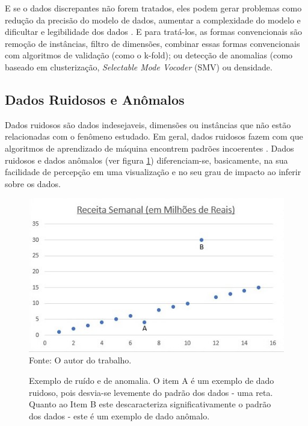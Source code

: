 \documentclass[
	12pt,				%
	openright,			%
	oneside,			%
	a4paper,			%
	english,			%
	brazil				%
	]{abntex2}
\begin{document}
		E se o dados discrepantes não forem tratados, eles podem gerar problemas como 
		redução da precisão do modelo de dados,
		aumentar a complexidade do modelo e
		dificultar e legibilidade dos dados \cite{Aggarwal2012} \cite{rathi_2019}.
		E para tratá-los, as formas convencionais são 
		remoção de instâncias,
		filtro de dimensões,
		combinar essas formas convencionais com algoritmos de validação (como o k-fold);
		ou detecção de anomalias (como baseado em clusterização, \emph{Selectable Mode Vocoder} (SMV) ou densidade.
	
		\subsection{Dados Ruidosos e Anômalos}
			Dados ruidosos são dados indesejaveis, dimensões ou instâncias que não estão relacionadas com o fenômeno estudado.
			Em geral, dados ruidosos fazem com que algoritmos de aprendizado de máquina encontrem padrões incoerentes \cite{rathi_2019}.
			Dados ruidosos e dados anômalos (ver figura \ref{fig:ruidoAnomalo}) diferenciam-se, basicamente, na sua facilidade de percepção em uma visualização e no seu grau de impacto ao inferir sobre os dados.
			\begin{figure}[h!]
				\centering
				\caption{
					Exemplo de ruído e de anomalia. 
					O item A é um exemplo de dado ruidoso, pois desvia-se levemente do padrão dos dados - uma reta.
					Quanto ao Item B este descaracteriza significativamente o padrão dos dados - este é um exemplo de dado anômalo.
				}
				\includegraphics[width=\linewidth]{./figures/FundamentacaoTeorica/ExemploRuidoAnomalo.jpg}
				\label{fig:ruidoAnomalo}
				\footnotesize Fonte: O autor do trabalho.
			\end{figure}
			\par
			
\end{document}
